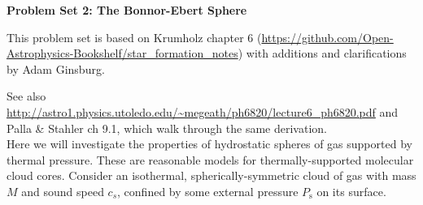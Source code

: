\documentclass{article}
\begin{document}
\noindent\textbf{Problem Set 2: The Bonnor-Ebert Sphere}

This problem set is based on Krumholz chapter 6
(\url{https://github.com/Open-Astrophysics-Bookshelf/star_formation_notes})
with additions and clarifications by Adam Ginsburg.

See also
\url{http://astro1.physics.utoledo.edu/~megeath/ph6820/lecture6_ph6820.pdf} and
Palla \& Stahler ch 9.1,
which walk through the same derivation.   
\\

Here we will investigate the properties of hydrostatic spheres of gas supported
by thermal pressure. These are reasonable models for thermally-supported
molecular cloud cores. Consider an isothermal, spherically-symmetric cloud of
gas with mass $M$ and sound speed $c_s$, confined by some external pressure
$P_{\mathrm{s}}$ on its surface.
\end{document}
